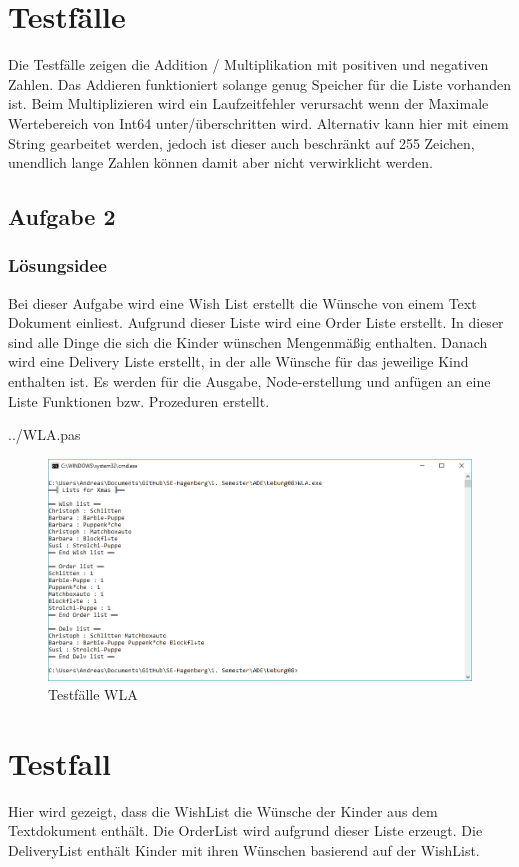 \section*{Testfälle}
Die Testfälle zeigen die Addition / Multiplikation mit positiven und negativen Zahlen. Das Addieren funktioniert solange genug Speicher für die Liste vorhanden ist. Beim Multiplizieren wird ein Laufzeitfehler verursacht wenn der Maximale Wertebereich von Int64 unter/überschritten wird. Alternativ kann hier mit einem String gearbeitet werden, jedoch ist dieser auch \grqq beschränkt\grqq{} auf 255 Zeichen,  \grqq unendlich lange\grqq{} Zahlen können damit aber nicht verwirklicht werden.
\newpage

\subsection*{Aufgabe 2}
\subsubsection*{Lösungsidee}
Bei dieser Aufgabe wird eine Wish List erstellt die Wünsche von einem Text Dokument einliest. Aufgrund dieser Liste wird eine Order Liste erstellt. In dieser sind alle Dinge die sich die Kinder wünschen Mengenmäßig enthalten. Danach wird eine Delivery Liste erstellt, in der alle Wünsche für das jeweilige Kind enthalten ist. Es werden für die Ausgabe, Node-erstellung und anfügen an eine Liste Funktionen bzw. Prozeduren erstellt.
\newline

 {../WLA.pas}
\begin{figure}[H]
	\centering
	\includegraphics[scale=0.65]{./pictures/XMAS.png}
	\caption{Testfälle WLA}
	\label{fig: WLA}
\end{figure}

\section*{Testfall}
Hier wird gezeigt, dass die WishList die Wünsche der Kinder aus dem Textdokument enthält. Die OrderList wird aufgrund dieser Liste erzeugt. Die DeliveryList enthält Kinder mit ihren Wünschen basierend auf der WishList.
\newpage



